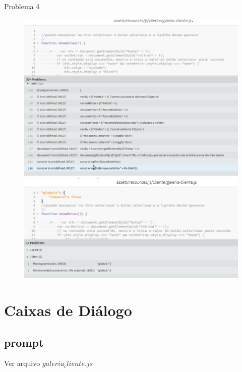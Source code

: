 Problema 4
\begin{figure}[!htb]
\setcounter{figure}{0}
\centering
\begin{minipage}{.5\textwidth}
  \centering
  \includegraphics[width=.9\linewidth]{./img/hint4.png}
\end{minipage}%
\begin{minipage}{.5\textwidth}
  \centering
  \includegraphics[width=.7\linewidth]{./img/hint4-arrumado.png}
\end{minipage}
\end{figure}	

\section{Caixas de Diálogo}

\subsection{prompt}

	Ver arquivo $galeria_cliente.js$
	
